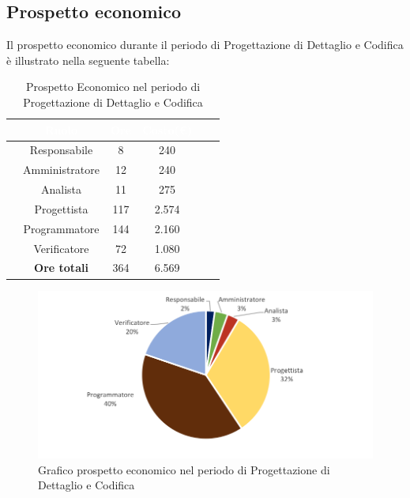 \subsection{Prospetto economico}
Il prospetto economico durante il periodo di Progettazione di Dettaglio e Codifica è illustrato nella seguente tabella:

\begin{table}[ht]
	\begin{center}
		\begin{tabular}{cccccc}
			\rowcolor{coolblack}
			\hline
			&\textcolor{white}{Ruolo}&	\textcolor{white}{Ore} &\textcolor{white}{Costo(\euro)} \\
			\hline
			&Responsabile           &8&240\\
			&Amministratore        & 12& 240 \\
			&Analista                   & 11& 275 \\
			&Progettista              &  117& 2.574\\
			&Programmatore       & 144& 2.160 \\
			&Verificatore             & 72& 1.080 \\
			\hline
			&\textbf{Ore totali}    &364&6.569\\
		\end{tabular}
		\caption{Prospetto Economico nel periodo di Progettazione di Dettaglio e Codifica}
	\end{center}
\end{table}

\begin{figure}[!ht]
	\begin{center}
		\includegraphics{images/grafoProgettazioneDettaglioCodificaEuro.png}
		\caption{Grafico prospetto economico nel periodo di Progettazione di Dettaglio e Codifica}
	\end{center}
\end{figure}

